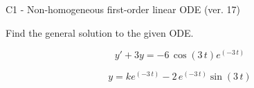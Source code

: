 \begin{exercise}
  \begin{exerciseTitle}C1 - Non-homogeneous first-order linear ODE (ver. 17)\end{exerciseTitle}
  \begin{exerciseStatement}
    
Find the general solution to the given ODE.

    
\[y'+3y= -6 \, \cos\left(3 \, t\right) e^{\left(-3 \, t\right)}\]

  \end{exerciseStatement}
  \begin{exerciseAnswer}
    
\[y= k e^{\left(-3 \, t\right)} - 2 \, e^{\left(-3 \, t\right)} \sin\left(3 \, t\right)\]

  \end{exerciseAnswer}
\end{exercise}